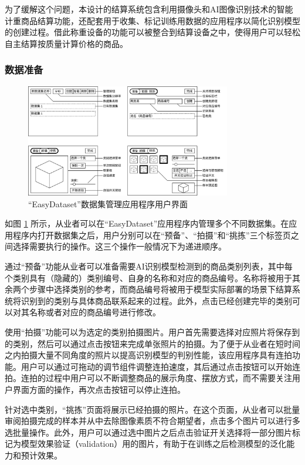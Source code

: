 为了缓解这个问题，本设计的结算系统包含利用摄像头和AI图像识别技术的智能计重商品结算功能，还配套用于收集、标记训练用数据的应用程序以简化识别模型的创建过程。借此称重设备的功能可以被整合到结算设备之中，使得用户可以轻松自主结算按质量计算价格的商品。

\subsubsection{数据准备}

\begin{figure}[htbp]
	\centering
	\includegraphics[width=0.8\textwidth]{./imgs/easydataset.png}
	\caption{“EasyDataset”数据集管理应用程序用户界面}
	\label{fig:easydataset}
\end{figure}

如图 \ref{fig:easydataset} 所示，从业者可以在“EasyDataset”应用程序内管理多个不同数据集。在应用程序内打开数据集之后，用户分别可以在“预备”、“拍摄”和“挑拣”三个标签页之间选择需要执行的操作。这三个操作一般情况下为递进顺序。

通过“预备”功能从业者可以准备需要AI识别模型检测到的商品类别列表，其中每个类别具有（隐藏的）类别编号、自身的名称和对应的商品编号。名称将被用于其余两个步骤中选择类别的参考，而商品编号将被用于模型实际部署的场景下结算系统将识别到的类别与具体商品联系起来的过程。此外，点击已经创建完毕的类别可以对其名称或者对应的商品编号进行修改。

使用“拍摄”功能可以为选定的类别拍摄图片。用户首先需要选择对应照片将保存到的类别，然后可以通过点击按钮来完成单张照片的拍摄。为了便于从业者在短时间之内拍摄大量不同角度的照片以提高识别模型的判别性能，该应用程序具有连拍功能。用户可以通过可拖动的调节组件调整连拍速度，其后通过点击按钮可以开始连拍。连拍的过程中用户可以不断调整商品的展示角度、摆放方式，而不需要关注用户界面方面的操作，再次点击按钮可以停止连拍。

针对选中类别，“挑拣”页面将展示已经拍摄的照片。在这个页面，从业者可以批量审阅拍摄完成的样本并从中去除图像素质不符合期望者，点击多个图片可以进行多选批量操作。此外，用户可以通过选中图片之后点击验证开关选择将一部分图片标记为模型效果验证（validation）用的图片，有助于在训练之后检测模型的泛化能力和预计效果。

